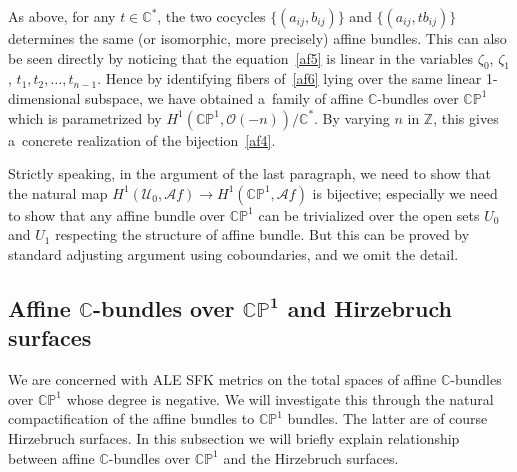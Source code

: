 As above, for any $t\in\mathbb{C}^*$, the two cocycles $\{(a_{ij}, b_{ij})\}$ and $\{(a_{ij}, tb_{ij})\}$ determines the
same (or isomorphic, more precisely) af\/f\/ine bundles.
This can also be seen directly by noticing that the equation~\eqref{af5} is linear in the variables
$\zeta_0$, $\zeta_1$, $t_1,t_2,\dots,t_{n-1}$.
Hence by identifying f\/ibers of~\eqref{af6} lying over the same linear 1-dimensional subspace, we have obtained
a~family of af\/f\/ine $\mathbb{C}$-bundles over $\mathbb{CP}^1$ which is parametrized by $H^1(\mathbb{CP}^1,\mathscr
O(-n))/\mathbb{C}^*$.
By varying $n$ in $\mathbb{Z}$, this gives a~concrete realization of the bijection~\eqref{af4}.

Strictly speaking, in the argument of the last paragraph, we need to show that the natural map $H^1(\mathscr
U_0,\mathscr Af)\to H^1(\mathbb{CP}^1,\mathscr Af)$ is bijective; especially we need to show that any af\/f\/ine bundle
over $\mathbb{CP}^1$ can be trivialized over the open sets $U_0$ and $U_1$ respecting the structure of af\/f\/ine
bundle.
But this can be proved by standard adjusting argument using coboundaries, and we omit the detail.

\subsection[Af\/f\/ine $\mathbb{C}$-bundles over $\mathbb{CP}^1$ and Hirzebruch surfaces]{Af\/f\/ine
$\boldsymbol{\mathbb{C}}$-bundles over $\boldsymbol{\mathbb{CP}^1}$ and Hirzebruch surfaces}
\label{ss:AH}

We are concerned with ALE SFK metrics on the total spaces of af\/f\/ine $\mathbb{C}$-bundles over $\mathbb{CP}^1$ whose
degree is negative.
We will investigate this through the natural compactif\/ication of the af\/f\/ine bundles to $\mathbb{CP}^1$ bundles.
The latter are of course Hirzebruch surfaces.
In this subsection we will brief\/ly explain relationship between af\/f\/ine $\mathbb{C}$-bundles over $\mathbb{CP}^1$
and the Hirzebruch surfaces.

